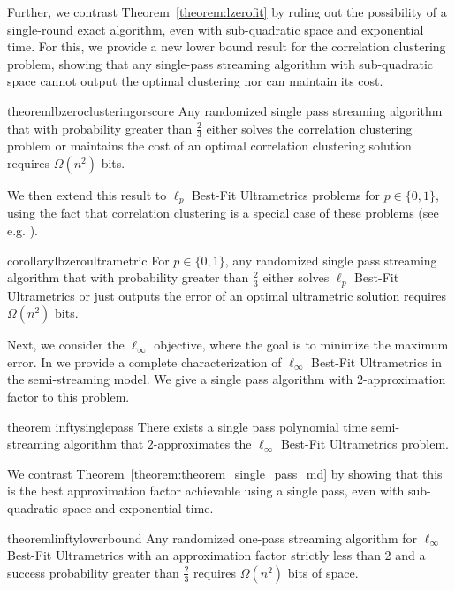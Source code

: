 \documentclass{article}
\begin{document}
Further, we contrast Theorem~\ref{theorem:lzerofit} by ruling out the possibility of a single-round exact algorithm, even with sub-quadratic space and exponential time. For this, we provide a new lower bound result for the correlation clustering problem, showing that any single-pass streaming algorithm with sub-quadratic space cannot output the optimal clustering nor can maintain its cost.

\begin{restatable}{theorem}{lbzeroclusteringorscore}
    Any randomized single pass streaming algorithm that with probability greater than $\frac{2}{3}$ either solves the correlation clustering problem or maintains the cost of an optimal correlation clustering solution  requires $\Omega(n^2)$ bits.
\end{restatable}

We then extend this result to $\ell_p$ Best-Fit Ultrametrics problems for $p \in \{ 0,1 \}$, using the fact that correlation clustering is a special case of these problems (see e.g. \cite{charikar}).

\begin{restatable}{corollary}{lbzeroultrametric}
    For $p \in \{0,1\}$, any randomized single pass streaming algorithm that with probability greater than $\frac{2}{3}$ either solves $\ell_p$ Best-Fit Ultrametrics or just outputs the error of an optimal ultrametric solution requires $\Omega(n^2)$ bits.
\end{restatable}

Next, we consider the $\ell_\infty$ objective, where the goal is to minimize the maximum error.
In  we provide a complete characterization of $\ell_\infty$ Best-Fit Ultrametrics in the semi-streaming model.
We give a single pass algorithm with $2$-approximation factor to this problem.

\begin{restatable}{theorem}
{inftysinglepass}\label{theorem:theorem_single_pass_md}
There exists a single pass polynomial time semi-streaming algorithm that $2$-approximates the $\ell_\infty$ Best-Fit Ultrametrics problem.
\end{restatable}

We contrast Theorem~\ref{theorem:theorem_single_pass_md} by showing that this is the best approximation factor achievable using a single pass, even with sub-quadratic space and exponential time.

\begin{restatable}{theorem}{linftylowerbound}
\label{theorem:l_infty_lower_bound}
Any randomized one-pass streaming algorithm for \(\ell_\infty\) Best-Fit Ultrametrics with an approximation factor strictly less than 2 and a success probability greater than \(\frac{2}{3}\) requires \(\Omega(n^2)\) bits of space.
\end{restatable}
\end{document}
